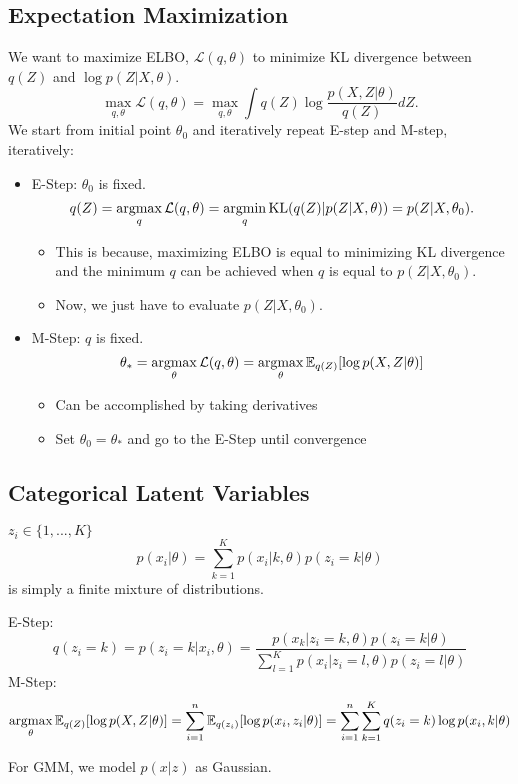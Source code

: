 \subsection{Expectation Maximization}
We want to maximize ELBO, $\mathcal{L}(q,\theta)$ to minimize KL divergence between $q(Z)$ and $\log p(Z|X,\theta)$.
$$\max_{q,\theta}\mathcal{L}(q,\theta) = \max_{q,\theta}\int q(Z)\log \frac{p(X,Z|\theta)}{q(Z)}dZ.$$
We start from initial point $\theta_0$ and iteratively repeat \Ni E-step and \Nii M-step, iteratively:
\begin{itemize}
	\item E-Step: $\theta_0$ is fixed. 
		$$q(Z) = \operatorname*{\operatorname{argmax}}_{q}\mathcal{L}(q,\theta) = \operatorname*{\operatorname{argmin}}_{q}\textrm{KL}(q(Z)|p(Z|X,\theta)) = p(Z|X,\theta_0).$$ 
		\begin{itemize}
			\item This is because, maximizing ELBO is equal to minimizing KL divergence and the minimum $q$ can be achieved when $q$ is equal to $p(Z|X,\theta_0)$.
			\item Now, we just have to evaluate $p(Z|X,\theta_0)$.
		\end{itemize}
	\item M-Step: $q$ is fixed.
		$$\theta_* = \operatorname*{\operatorname{argmax}}_{\theta}\mathcal{L}(q,\theta) = \operatorname*{\operatorname{argmax}}_{\theta}\mathbb{E}_{q(Z)}[\log p(X,Z|\theta)]$$
		\begin{itemize}
			\item Can be accomplished by taking derivatives
			\item Set $\theta_0=\theta_*$ and go to the E-Step until convergence
		\end{itemize}
	
\end{itemize}

\subsection{Categorical Latent Variables}
$z_i \in \{1,...,K\}$
$$p(x_i|\theta) = \sum_{k=1}^{K}p(x_i|k,\theta)p(z_i=k|\theta)$$
is simply a finite mixture of distributions. 

E-Step:
$$q(z_i=k) = p(z_i=k|x_i,\theta) = \frac{p(x_k|z_i=k,\theta)p(z_i=k|\theta)}{\sum_{l=1}^{K}p(x_i|z_i=l,\theta)p(z_i=l|\theta)}$$
M-Step:
$$\operatorname*{\operatorname{argmax}}_{\theta}\mathbb{E}_{q(Z)}[\log p(X,Z|\theta)] = \sum_{i=1}^{n}\mathbb{E}_{q(z_i)}[\log p(x_i,z_i|\theta)] = \sum_{i=1}^{n}\sum_{k=1}^{K}q(z_i=k)\log p(x_i,k|\theta)$$

For GMM, we model $p(x|z)$ as Gaussian.

%
